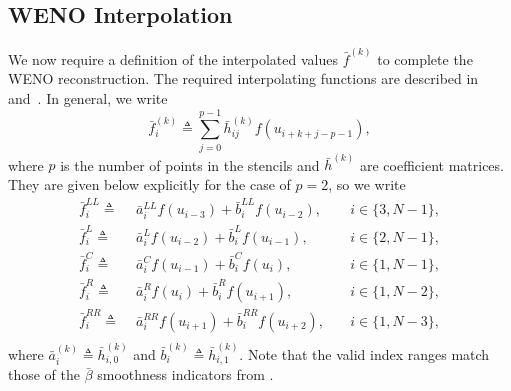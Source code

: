 \documentclass{scrartcl}
\begin{document}

\subsection{WENO Interpolation} %
\label{ssc:weno:interp}

We now require a definition of the interpolated values $\bar{f}^{(k)}$ to
complete the WENO reconstruction. The required interpolating functions are
described in~\cite[Appendix C.2]{Fisher2011} and~\cite[Equation A.15]{Fisher2012}.
In general, we write
\[
\bar{f}_i^{(k)} \triangleq \sum_{j = 0}^{p - 1} \bar{h}^{(k)}_{ij} f(u_{i + k + j - p - 1}),
\]
where $p$ is the number of points in the stencils and $\bar{h}^{(k)}$ are
coefficient matrices. They are given below explicitly for the case of $p = 2$,
so we write
\[
\begin{aligned}
\bar{f}^{LL}_i \triangleq\,\, &
    \bar{a}^{LL}_i f(u_{i - 3}) + \bar{b}^{LL}_i f(u_{i - 2}), &
    \quad i \in \{3, N - 1\}, \\
\bar{f}^{L}_i \triangleq\,\, &
    \bar{a}^{L}_i f(u_{i - 2}) + \bar{b}^{L}_i f(u_{i - 1}), &
    \quad i \in \{2, N - 1\}, \\
\bar{f}^{C}_i \triangleq\,\, &
    \bar{a}^{C}_i f(u_{i - 1}) + \bar{b}^{C}_i f(u_i), &
    \quad i \in \{1, N - 1\}, \\
\bar{f}^{R}_i \triangleq\,\, &
    \bar{a}^{R}_i f(u_i) + \bar{b}^{R}_i f(u_{i + 1}), &
    \quad i \in \{1, N - 2\}, \\
\bar{f}^{RR}_i \triangleq\,\, &
    \bar{a}^{RR}_i f(u_{i + 1}) + \bar{b}^{RR}_i f(u_{i + 2}), &
    \quad i \in \{1, N - 3\}, \\
\end{aligned}
\]
where $\bar{a}^{(k)}_i \triangleq \bar{h}^{(k)}_{i, 0}$ and
$\bar{b}^{(k)}_i \triangleq \bar{h}^{(k)}_{i, 1}$. Note that the valid index
ranges match those of the $\bar{\beta}$ smoothness indicators from
.
\end{document}
